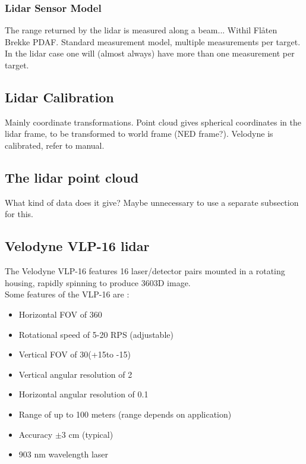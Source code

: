 \subsubsection{Lidar Sensor Model}
The range returned by the lidar is measured along a beam... Withil Flåten Brekke PDAF. 
Standard measurement model, multiple measurements per target. In the lidar case one will (almost always) have more than one measurement per target.
\subsection{Lidar Calibration}
Mainly coordinate transformations. Point cloud gives spherical coordinates in the lidar frame, to be transformed to world frame (NED frame?). Velodyne is calibrated, refer to manual.
\subsection{The lidar point cloud}
What kind of data does it give? Maybe unnecessary to use a separate subsection for this.
\subsection{Velodyne VLP-16 lidar}
The Velodyne VLP-16 features 16 laser/detector pairs mounted in a rotating housing, rapidly spinning to produce 360\degree 3D image.\smallskip \\
Some features of the VLP-16 are :
\begin{itemize}
    \item Horizontal FOV of 360\degree
    \item Rotational speed of 5-20 RPS (adjustable)
    \item Vertical FOV of 30\degree (+15\degree to -15\degree)
    \item Vertical angular resolution of 2\degree
    \item Horizontal angular resolution of 0.1\degree
    \item Range of up to 100 meters (range depends on application)
    \item Accuracy $\pm3$ cm (typical)
    \item 903 nm wavelength laser
\end{itemize}

\cleardoublepage